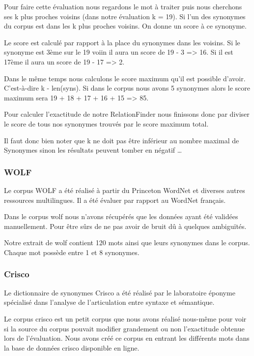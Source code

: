 Pour faire cette évaluation nous regardons le mot à traiter puis nous cherchons 
ses k plus proches voisins (dans notre évaluation k = 19). Si l'un des 
synonymes du corpus est dans les k plus proches voisins. On donne un score à ce 
synonyme.

Le score est calculé par rapport à la place du synonymes dans les voisins. Si 
le synonyme est 3ème sur le 19 voiin il aura un score de 19 - 3 => 16. Si il 
est 17ème il aura un score de 19 - 17 => 2.

Dans le même temps nous calculons le score maximum qu'il est possible d'avoir. 
C'est-à-dire k - len(syns). Si dans le corpus nous avons 5 synonymes alors le 
score maximum sera 19 + 18 + 17 + 16 + 15 => 85.

Pour calculer l'exactitude de notre RelationFinder nous finissons donc par 
diviser le score de tous nos synonymes trouvés par le score maximum total.

Il faut donc bien noter que k ne doit pas être inférieur au nombre maximal de 
Synonymes sinon les résultats peuvent tomber en négatif \dots

\subsubsection{WOLF}

Le corpus WOLF a été réalisé à partir du Princeton WordNet et diverses autres 
ressources multilingues. Il a été évaluer par rapport au WordNet français.

Dans le corpus wolf nous n'avons récupérés que les données ayant été validées 
manuellement. Pour être sûrs de ne pas avoir de bruit dû à quelques ambiguïtés.

Notre extrait de wolf contient 120 mots ainsi que leurs synonymes dans le 
corpus. Chaque mot possède entre 1 et 8 synonymes.

\subsubsection{Crisco}

Le dictionnaire de synonymes Crisco a été réalisé par le laboratoire éponyme 
spécialisé dans l’analyse de l’articulation entre syntaxe et sémantique.

Le corpus crisco est un petit corpus que nous avons réalisé nous-même pour voir 
si la source du corpus pouvait modifier grandement ou non l'exactitude obtenue 
lors de l'évaluation. Nous avons créé ce corpus en entrant les différents mots 
dans la base de données crisco disponible en ligne.

